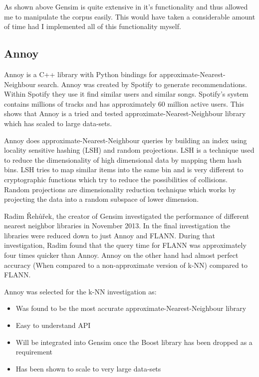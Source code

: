 As shown above Gensim is quite extensive in it's functionality and thus allowed me to manipulate the corpus easily.
This would have taken a considerable amount of time had I implemented all of this functionality myself.

\subsection{Annoy}
Annoy is a C++ library with Python bindings for approximate-Nearest-Neighbour search.
Annoy was created by Spotify to generate recommendations.
Within Spotify they use it find similar users and similar songs.
Spotify's system contains millions of tracks and has approximately 60 million active users.
This shows that Annoy is a tried and tested approximate-Nearest-Neighbour library which has scaled to large data-sets.

Annoy does approximate-Nearest-Neighbour queries by building an index using locality sensitive hashing (LSH) and random projections.
LSH is a technique used to reduce the dimensionality of high dimensional data by mapping them hash bins.
LSH tries to map similar items into the same bin and is very different to cryptographic functions which try to reduce the possibilities of collisions.
Random projections are dimensionality reduction technique which works by projecting the data into a random subspace of lower dimension.

Radim {\v R}eh{\r u}{\v r}ek, the creator of Gensim investigated the performance of different nearest neighbor libraries in November 2013.
In the final investigation the libraries were reduced down to just Annoy and FLANN.
During that investigation, Radim found that the query time for FLANN was approximately four times quicker than Annoy.
Annoy on the other hand had almost perfect accuracy (When compared to a non-approximate version of k-NN) compared to FLANN.

Annoy was selected for the k-NN investigation as:
\begin{itemize}
    \item Was found to be the most accurate approximate-Nearest-Neighbour library
    \item Easy to understand API
    \item Will be integrated into Gensim once the Boost library has been dropped as a requirement
    \item Has been shown to scale to very large data-sets
\end{itemize}

